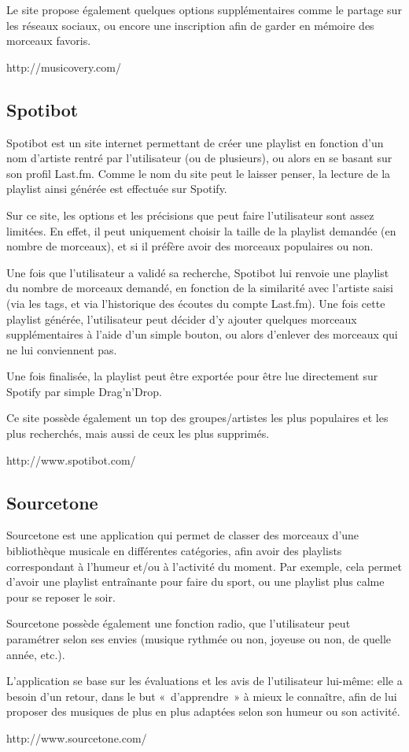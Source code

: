 Le site propose également quelques options supplémentaires comme le partage 
sur les réseaux sociaux, ou encore une inscription afin de garder en mémoire 
des morceaux favoris.

http://musicovery.com/

\subsection{Spotibot}
\label{existant:generateurs:spotibot}

Spotibot est un site internet permettant de créer une playlist en fonction 
d'un nom d'artiste rentré par l'utilisateur (ou de plusieurs), ou alors en 
se basant sur son profil Last.fm. Comme le nom du site peut le laisser 
penser, la lecture de la playlist ainsi générée est effectuée sur Spotify.

Sur ce site, les options et les précisions que peut faire l'utilisateur sont 
assez limitées. En effet, il peut uniquement choisir la taille de la 
playlist demandée (en nombre de morceaux), et si il préfère avoir des 
morceaux populaires ou non.

Une fois que l'utilisateur a validé sa recherche, Spotibot lui renvoie une 
playlist du nombre de morceaux demandé, en fonction de la similarité avec 
l'artiste saisi (via les tags, et via l'historique des écoutes du compte 
Last.fm). Une fois cette playlist générée, l'utilisateur peut décider d'y 
ajouter quelques morceaux supplémentaires à l'aide d'un simple bouton, ou 
alors d'enlever des morceaux qui ne lui conviennent pas.

Une fois finalisée, la playlist peut être exportée pour être lue directement 
sur Spotify par simple Drag'n'Drop.

Ce site possède également un top des groupes/artistes les plus populaires et 
les plus recherchés, mais aussi de ceux les plus supprimés.

http://www.spotibot.com/

\subsection{Sourcetone}
\label{existant:generateurs:sourcetone}

Sourcetone est une application qui permet de classer des morceaux d'une 
bibliothèque musicale en différentes catégories, afin avoir des playlists 
correspondant à l'humeur et/ou à l'activité du moment. Par exemple, cela 
permet d'avoir une playlist entraînante pour faire du sport, ou une playlist 
plus calme pour se reposer le soir.

Sourcetone possède également une fonction radio, que l'utilisateur peut 
paramétrer selon ses envies (musique rythmée ou non, joyeuse ou non, de 
quelle année, etc.).

L'application se base sur les évaluations et les avis de l'utilisateur 
lui-même: elle a besoin d'un retour, dans le but «~d'apprendre~» à mieux le 
connaître, afin de lui proposer des musiques de plus en plus adaptées selon 
son humeur ou son activité.

http://www.sourcetone.com/